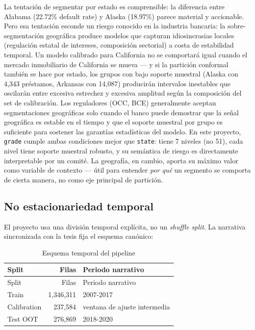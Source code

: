 \documentclass[
  spanish,
  11pt,
  letterpaper,
]{scrbook}
\theoremstyle{plain}
\theoremstyle{remark}
\begin{document}
La tentación de segmentar por estado es comprensible: la diferencia
entre Alabama (22.72\% default rate) y Alaska (18.97\%) parece material
y accionable. Pero esa tentación esconde un riesgo conocido en la
industria bancaria: la sobre-segmentación geográfica produce modelos que
capturan idiosincrasias locales (regulación estatal de intereses,
composición sectorial) a costa de estabilidad temporal. Un modelo
calibrado para California no se comportará igual cuando el mercado
inmobiliario de California se mueva --- y si la partición conformal
también se hace por estado, los grupos con bajo soporte muestral (Alaska
con 4,343 préstamos, Arkansas con 14,087) producirán intervalos
inestables que oscilarán entre excesiva estrechez y excesiva amplitud
según la composición del set de calibración. Los reguladores (OCC, BCE)
generalmente aceptan segmentaciones geográficas solo cuando el banco
puede demostrar que la señal geográfica es estable en el tiempo y que el
soporte muestral por grupo es suficiente para sostener las garantías
estadísticas del modelo. En este proyecto, \texttt{grade} cumple ambas
condiciones mejor que \texttt{state}: tiene 7 niveles (no 51), cada
nivel tiene soporte muestral robusto, y su semántica de riesgo es
directamente interpretable por un comité. La geografía, en cambio,
aporta su máximo valor como variable de contexto --- útil para entender
\emph{por qué} un segmento se comporta de cierta manera, no como eje
principal de partición.

\subsection{No estacionariedad
temporal}\label{no-estacionariedad-temporal}

El proyecto usa una división temporal explícita, no un \emph{shuffle
split}. La narrativa sincronizada con la tesis fija el esquema canónico:

\begin{longtable}[]{@{}lrl@{}}
\caption{Esquema temporal del
pipeline}\label{tbl-temporal-split}\tabularnewline
\toprule\noalign{}
Split & Filas & Periodo narrativo \\
\midrule\noalign{}
\endfirsthead
\toprule\noalign{}
Split & Filas & Periodo narrativo \\
\midrule\noalign{}
\endhead
\bottomrule\noalign{}
\endlastfoot
Train & 1,346,311 & 2007-2017 \\
Calibration & 237,584 & ventana de ajuste intermedia \\
Test OOT & 276,869 & 2018-2020 \\
\end{longtable}
\end{document}
